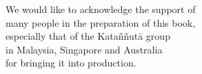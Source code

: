 
\vspace*{4\baselineskip}

{\centering

\begin{minipage}{0.9\linewidth}
\centering\small
We would like to acknowledge the support of\\
many people in the preparation of this book,\\
especially that of the Kataññutā group\\
in Malaysia, Singapore and Australia\\
for bringing it into production.

\end{minipage}

}
